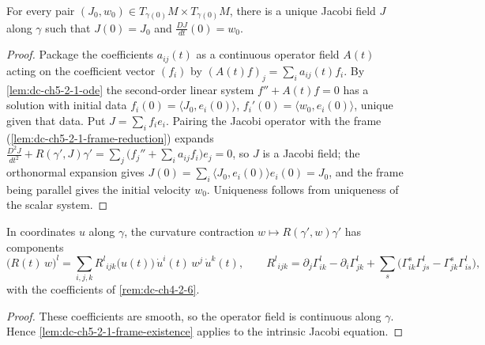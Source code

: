 \begin{lemma}
  \label{lem:dc-ch5-2-1-frame-existence}
  \leanok
  For every pair $(J_0,w_0)\in T_{\gamma(0)}M\times T_{\gamma(0)}M$, there is a
  unique Jacobi field $J$ along $\gamma$ such that
  $J(0)=J_0$ and $\frac{DJ}{dt}(0)=w_0$.
\end{lemma}
\begin{proof}
  \leanok
  \sketch
  Package the coefficients $a_{ij}(t)$ as a continuous operator field $A(t)$ acting on the
  coefficient vector $(f_i)$ by $(A(t)f)_j=\sum_i a_{ij}(t)f_i$. By \cref{lem:dc-ch5-2-1-ode}
  the second-order linear system $f''+A(t)f=0$ has a solution with initial data
  $f_i(0)=\langle J_0,e_i(0)\rangle$, $f_i'(0)=\langle w_0,e_i(0)\rangle$, unique given that
  data. Put $J=\sum_i f_i e_i$. Pairing the Jacobi operator with the frame
  (\cref{lem:dc-ch5-2-1-frame-reduction}) expands
  $\frac{D^2J}{dt^2}+R(\gamma',J)\gamma'=\sum_j\big(f_j''+\sum_i a_{ij}f_i\big)e_j=0$, so $J$
  is a Jacobi field; the orthonormal expansion gives
  $J(0)=\sum_i\langle J_0,e_i(0)\rangle e_i(0)=J_0$, and the frame being parallel gives the
  initial velocity $w_0$. Uniqueness follows from uniqueness of the scalar system.
\end{proof}

\begin{lemma}
  \label{lem:dc-ch5-2-1-real-curvature}
  \leanok
  In coordinates $u$ along $\gamma$, the curvature contraction
  $w\mapsto R(\gamma',w)\gamma'$ has components
  $$
  \big(R(t)\,w\big)^l=\sum_{i,j,k}R^l{}_{ijk}\big(u(t)\big)\,\dot u^i(t)\,w^j\,\dot u^k(t),
  \qquad
  R^l{}_{ijk}=\partial_j\Gamma^l_{ik}-\partial_i\Gamma^l_{jk}
    +\sum_s\big(\Gamma^s_{ik}\Gamma^l_{js}-\Gamma^s_{jk}\Gamma^l_{is}\big),
  $$
  with the coefficients of \cref{rem:dc-ch4-2-6}.
\end{lemma}
\begin{proof}

  \sketch
  These coefficients are smooth, so the operator field is continuous along $\gamma$. Hence
  \cref{lem:dc-ch5-2-1-frame-existence} applies to the intrinsic Jacobi equation.
\end{proof}

